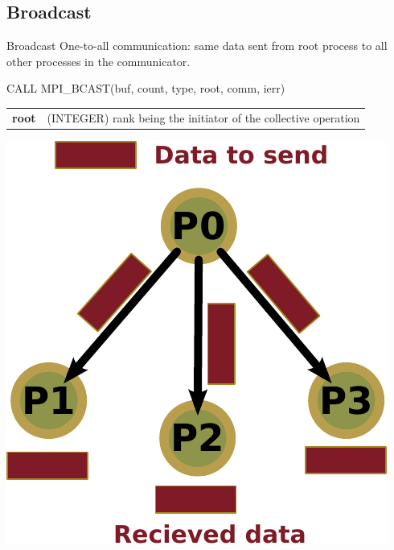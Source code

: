 \documentclass[aspectratio=43]{beamer}
\begin{document}
\subsection{Broadcast}
\begin{frame}[fragile]{Broadcast}
One-to-all communication: same data sent from root process to all other processes in the communicator.\\
\begin{Fortranlisting}[]{}
CALL MPI_BCAST(buf, count, type, root, comm, ierr)
\end{Fortranlisting}
\begin{black1block}{}
\begin{tabular}{rp{8cm}}
\textbf{root} & (INTEGER) rank being the initiator of the collective operation\\
\end{tabular}
\end{black1block}
\begin{center}
\includegraphics[scale=0.5]{03.MPI_Coll/broadcast.pdf}
\end{center}
\end{frame}
\end{document}
